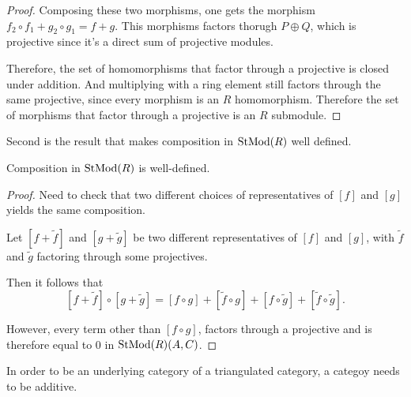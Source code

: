 \begin{proof}
    Composing these two morphisms, one gets the morphism \( f_2 \circ f_1 + g_2 \circ g_1 = f + g \). This morphisms factors thorugh \( P \oplus Q \), which is projective since it's a direct sum of projective modules.

    Therefore, the set of homomorphisms that factor through a projective is closed under addition. And multiplying with a ring element still factors through the same projective, since every morphism is an \( R \) homomorphism. Therefore the set of morphisms that factor through a projective is an \( R \) submodule.
\end{proof}

Second is the result that makes composition in \( \operatorname{StMod}(R) \) well defined.

\begin{lemma}
    \label{lem:stmod_composition_well-defined}
    Composition in \( \operatorname{StMod}(R) \) is well-defined.
\end{lemma}
\begin{proof}
    Need to check that two different choices of representatives of \( [f] \) and \( [g] \) yields the same composition.

    Let \( [f + \widetilde{f}] \) and \( [g + \widetilde{g}] \) be two different representatives of \( [f] \) and \( [g] \), with \( \widetilde{f} \) and \( \widetilde{g} \) factoring through some projectives.

    Then it follows that
    \[
        [f + \widetilde{f}] \circ [g + \widetilde{g}] = [f \circ g] + [\widetilde{f} \circ g] + [f \circ \widetilde{g}] + [\widetilde{f} \circ \widetilde{g}].
    \]
    
    However, every term other than \( [f \circ g] \), factors through a projective and is therefore equal to \( 0 \) in \( \operatorname{StMod}(R)(A, C) \).
\end{proof}

In order to be an underlying category of a triangulated category, a categoy needs to be additive.

